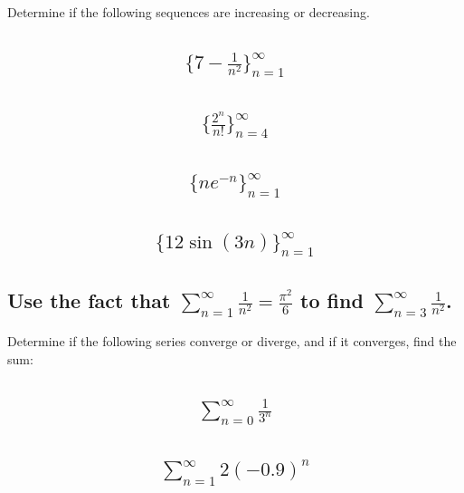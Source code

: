 \documentclass{article}
\begin{document}
Determine if the following sequences are increasing or decreasing.
\subsection{
	\begin{align*}
    		\biggl\{ 7 - \frac{1}{n^2} \biggl\}_{n = 1}^{\infty}
	\end{align*}
}

\subsection{
	\begin{align*}
    		\biggl\{ \frac{2^n}{n!} \biggl\}_{n = 4}^{\infty}
	\end{align*}
}

\subsection{
	\begin{align*}
    		\{n e^{-n} \}_{n = 1}^{\infty}
	\end{align*}
}

\subsection{
	\begin{align*}
    		\{ 12 \sin{(3n)} \}_{n = 1}^{\infty}
	\end{align*}
}

\subsection{Use the fact that $\sum_{n = 1}^{\infty} \frac{1}{n^2} = \frac{\pi^2}{6}$ to find $\sum_{n = 3}^{\infty} \frac{1}{n^2}$.}

Determine if the following series converge or diverge, and if it converges, find the sum:
\subsection{
	\begin{align*}
		\sum_{n = 0}^{\infty} \frac{1}{3^n}
	\end{align*}
}

\subsection{
	\begin{align*}
		\sum_{n = 1}^{\infty} 2(-0.9)^n
	\end{align*}
}
\end{document}
